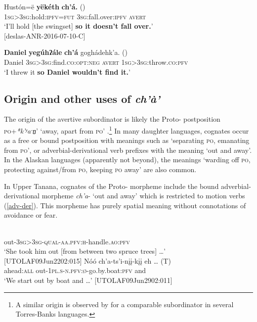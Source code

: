 \documentclass[output=paper,colorlinks,citecolor=brown]{langscibook}
\begin{document}
\ea \label{denesuline}
\gll Hustón=ë \textbf{yëkéth} \textbf{ch'á.}  \textnormal{()}\\
\textsc{1sg>3sg}:hold:\textsc{ipfv=fut} \textsc{3sg}:fall.over:\textsc{ipfv} \textsc{avert} \\
\glt `I'll hold [the swingset] \textbf{so it doesn't fall over.}' \\ \hfill [deslas-ANR-2016-07-10-C] 
\z

\ea \label{slave}
\gll   \textbf{Daniel} \textbf{yegúhʔále} \textbf{ch'á} goghádehk'a. \textnormal{()} \\
Daniel \textsc{3sg>3sg}:find.\textsc{co:opt:neg} \textsc{avert} \textsc{1sg>3sg}:throw.\textsc{co:pfv} \\
\glt `I threw it \textbf{so Daniel wouldn't find it.}' \hfill \citep[1262]{RiceK1989} 
\z


\subsection{Origin and other uses of \textit{ch'à'}}
\label{subsection:avertive-origin}
\largerpage


The origin of the avertive subordinator is likely the Proto- postposition \textsc{po}+\textit{*k'ʸaˑn̠}' `away, apart from \textsc{po}' \citep{LeerJ1996CA}.\footnote{A similar origin is observed by \citet{chapters/francois} for a comparable subordinator in several Torres-Banks languages.} In many daughter languages, cognates occur as a free or bound postposition with meanings such as `separating \textsc{po}, emanating from \textsc{po}', or adverbial-derivational verb prefixes with the meaning `out and away'. In the Alaskan languages (apparently not beyond), the meanings `warding off \textsc{po}, protecting against/from \textsc{po}, keeping \textsc{po} away' are also common.

In Upper Tanana, cognates of the Proto- morpheme include the bound adverbial-derivational morpheme \textit{ch'a}- `out and away' which is restricted to motion verbs (\ref{adv-der}). This morpheme has purely spatial meaning without connotations of avoidance or fear.

\begin{exe}
\ex\label{adv-der}
\begin{xlista}
\ex 
{} \\
out-\textsc{3sg>3sg-qual-aa.pfv:h}-handle.\textsc{ao:pfv} \\
\glt `She took him out [from between two spruce trees] \ldots' \\ \hfill [UTOLAF09Jun2202:015]
\ex
\gll Nóó ch'a-ts'i-nįį-kįį eh {\ldots} \textnormal{(T)}\\
ahead:\textsc{all} out-\textsc{1pl.s-n.pfv:ø}-go.by.boat:\textsc{pfv} and\\
\glt `We start out by boat and \ldots' \hfill [UTOLAF09Jun2902:011]
\end{xlista}
\end{exe}
\end{document}
